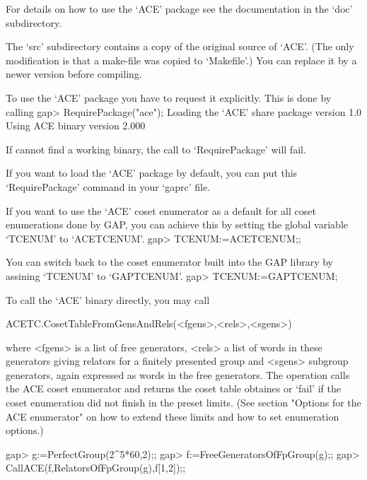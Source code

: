 For details on how to use the `ACE' package see the documentation in the
`doc' subdirectory.

The `src' subdirectory contains a copy of the original source of `ACE'. (The
only modification is that a make-file was copied to `Makefile'.) You can
replace it by a newer version before compiling.


To use the `ACE' package you have to request it explicitly. This is done by
calling 
\begintt
gap> RequirePackage("ace");
  Loading the `ACE' share package version 1.0
  Using ACE binary version 2.000
\endtt

If {\GAP} cannot find a working binary, the call to `RequirePackage' will
fail.

If you want to load the `ACE' package by default, you can put this
`RequirePackage' command in your `gaprc' file.

If you want to use the `ACE' coset enumerator as a default for all coset
enumerations done by GAP, you can achieve this by setting the global
variable `TCENUM' to `ACETCENUM'.
\begintt
gap> TCENUM:=ACETCENUM;;
\endtt

You
can switch back to the coset enumerator built into the GAP library by
assining `TCENUM' to `GAPTCENUM'.
\begintt
gap> TCENUM:=GAPTCENUM;
\endtt



To call the `ACE' binary directly, you may call

\>ACETC.CosetTableFromGensAndRels(<fgens>,<rels>,<sgens>)

where <fgens> is a list of free generators, <rels> a list of words in these
generators giving relators for a finitely presented group and <sgens>
subgroup generators, again expressed as words in the free generators. The
operation calls the ACE coset enumerator and returns the coset table
obtaines or `fail' if the coset enumeration did not finish in the preset
limits. (See section "Options for the ACE enumerator" on how to extend these
limits and how to set enumeration options.)

\begintt
gap> g:=PerfectGroup(2^5*60,2);;
gap> f:=FreeGeneratorsOfFpGroup(g);;
gap> CallACE(f,RelatorsOfFpGroup(g),f{[1,2]});;
\endtt


